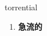
\begin{frame}
{\huge torrential}
\begin{center}
\begin{enumerate}\Large
  \item \textbf{急流的}
\end{enumerate}
\end{center}
\end{frame}

